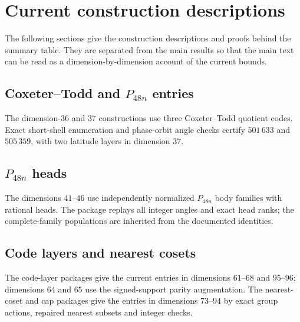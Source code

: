 \documentclass[11pt]{amsart}
\theoremstyle{remark}
\begin{document}
\appendix
\section{Current construction descriptions}\label{app:current}

The following sections give the construction descriptions and proofs behind the
summary table. They are separated from the main results so that the main text can
be read as a dimension-by-dimension account of the current bounds.

\subsection{Coxeter--Todd and $P_{48n}$ entries}\label{ss:d3637}

The dimension-$36$ and $37$ constructions use three Coxeter--Todd quotient
codes. Exact short-shell enumeration and phase-orbit angle checks certify
$501\,633$ and $505\,359$, with two latitude layers in dimension $37$.

\subsection{$P_{48n}$ heads}\label{ss:p48current}

The dimensions $41$--$46$ use independently normalized $P_{48n}$ body families
with rational heads. The package replays all integer angles and exact head ranks;
the complete-family populations are inherited from the documented identities.

\subsection{Code layers and nearest cosets}\label{ss:codecurrent}\label{ss:cosetscurrent}

The code-layer packages give the current entries in dimensions $61$--$68$ and
$95$--$96$; dimensions $64$ and $65$ use the signed-support parity
augmentation. The nearest-coset and cap packages give the entries in dimensions
$73$--$94$ by exact group actions, repaired nearest subsets and integer checks.
\end{document}
